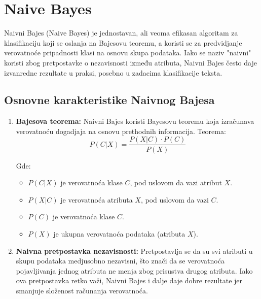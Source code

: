 \documentclass{article}
\begin{document}
\newpage
\section{Naive Bayes}
Naivni Bajes (Naive Bayes) je jednostavan, ali veoma efikasan algoritam za klasifikaciju koji se oslanja na Bajesovu teoremu, a koristi se za predvidjanje verovatnoće pripadnosti klasi na osnovu skupa podataka. Iako se naziv "naivni" koristi zbog pretpostavke o nezavisnosti između atributa, Naivni Bajes često daje izvanredne rezultate u praksi, posebno u zadacima klasifikacije teksta.

\subsection{Osnovne karakteristike Naivnog Bajesa}
\begin{enumerate}
    \item \textbf{Bajesova teorema:} Naivni Bajes koristi Bayesovu teoremu koja izračunava verovatnoću dogadjaja na osnovu prethodnih informacija. Teorema:
\[
P(C|X) = \frac{P(X|C) \cdot P(C)}{P(X)}
\]

Gde:
\begin{itemize}
    \item $P(C|X)$ je verovatnoća klase $C$, pod uslovom da vazi atribut $X$.
    \item $P(X|C)$ je verovatnoća atributa $X$, pod uslovom da vazi $C$.
    \item $P(C)$ je verovatnoća klase $C$.
    \item $P(X)$ je ukupna verovatnoća podataka (atributa $X$).
\end{itemize}

\item \textbf{Naivna pretpostavka nezavisnosti:} Pretpostavlja se da su svi atributi u skupu podataka medjusobno nezavisni, što znači da se verovatnoća pojavljivanja jednog atributa ne menja zbog prisustva drugog atributa. Iako ova pretpostavka retko važi, Naivni Bajes i dalje daje dobre rezultate jer smanjuje složenost računanja verovatnoća.


\end{enumerate}
\end{document}
